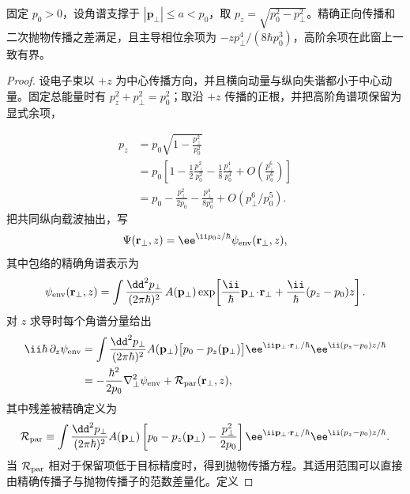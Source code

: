 \begin{proposition}[正根角谱与抛物传播误差]
固定 $p_0>0$，设角谱支撑于 $|\mathbf p_\perp|\le a<p_0$，取 $p_z=\sqrt{p_0^2-p_\perp^2}$。精确正向传播和二次抛物传播之差满足，且主导相位余项为 $-zp_\perp^4/(8\hbar p_0^3)$，高阶余项在此窗上一致有界。
\end{proposition}
\begin{proof}
设电子束以 $+z$ 为中心传播方向，并且横向动量与纵向失谐都小于中心动量。固定总能量时有 $p_z^2+p_\perp^2=p_0^2$；取沿 $+z$ 传播的正根，并把高阶角谱项保留为显式余项，

\begin{align*}
p_z
&=p_0\sqrt{1-\frac{p_\perp^2}{p_0^2}}\\
&=p_0\left[1-\frac12\frac{p_\perp^2}{p_0^2}
-\frac18\frac{p_\perp^4}{p_0^4}
+O\!\left(\frac{p_\perp^6}{p_0^6}\right)\right]\\
&=p_0-\frac{p_\perp^2}{2p_0}
-\frac{p_\perp^4}{8p_0^3}+O(p_\perp^6/p_0^5).
\end{align*}
把共同纵向载波抽出，写
\begin{equation*}
\Psi(\mathbf r_\perp,z)
=\ee^{\ii p_0z/\hbar}\psi_{\rm env}(\mathbf r_\perp,z),
\end{equation*}
其中包络的精确角谱表示为
\begin{equation*}
\psi_{\rm env}(\mathbf r_\perp,z)
=\int\frac{\dd^2 p_\perp}{(2\pi\hbar)^2}
\,A(\mathbf p_\perp)
\exp\!\left[\frac{\ii}{\hbar}
\mathbf p_\perp\!\cdot\!\mathbf r_\perp
+\frac{\ii}{\hbar}(p_z-p_0)z\right].
\end{equation*}
对 $z$ 求导时每个角谱分量给出
\begin{align*}
\ii\hbar\,\partial_z\psi_{\rm env}
&=\int\frac{\dd^2 p_\perp}{(2\pi\hbar)^2}
A(\mathbf p_\perp)
\bigl[p_0-p_z(\mathbf p_\perp)\bigr]
\ee^{\ii\mathbf p_\perp\cdot\mathbf r_\perp/\hbar}
\ee^{\ii(p_z-p_0)z/\hbar}\\
&=-\frac{\hbar^2}{2p_0}\nabla_\perp^2\psi_{\rm env}
+\mathcal R_{\rm par}(\mathbf r_\perp,z),
\end{align*}
其中残差被精确定义为
\begin{equation*}
\mathcal R_{\rm par}
\equiv
\int\frac{\dd^2 p_\perp}{(2\pi\hbar)^2}
A(\mathbf p_\perp)
\left[p_0-p_z(\mathbf p_\perp)-\frac{p_\perp^2}{2p_0}\right]
\ee^{\ii\mathbf p_\perp\cdot\mathbf r_\perp/\hbar}
\ee^{\ii(p_z-p_0)z/\hbar}.
\end{equation*}
当 $\mathcal R_{\rm par}$ 相对于保留项低于目标精度时，得到抛物传播方程。其适用范围可以直接由精确传播子与抛物传播子的范数差量化。定义

\end{proof}
